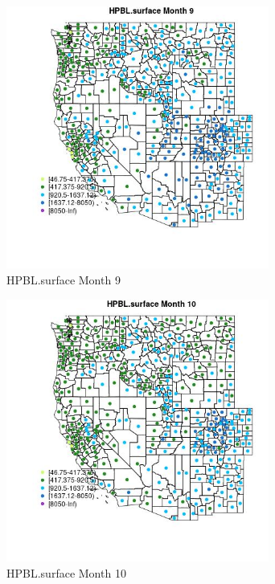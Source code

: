 \begin{figure} 
\centering  
\includegraphics[width=0.77\textwidth]{Code_Outputs/df_report_ML_predictors_CountyCentroid_Locations_Dates_2008-01-01to2018-12-31_MapObsMo9HPBLsurface.jpg} 
\caption{\label{fig:df_report_ML_predictors_CountyCentroid_Locations_Dates_2008-01-01to2018-12-31MapObsMo9HPBLsurface}HPBL.surface Month 9} 
\end{figure} 
 

\begin{figure} 
\centering  
\includegraphics[width=0.77\textwidth]{Code_Outputs/df_report_ML_predictors_CountyCentroid_Locations_Dates_2008-01-01to2018-12-31_MapObsMo10HPBLsurface.jpg} 
\caption{\label{fig:df_report_ML_predictors_CountyCentroid_Locations_Dates_2008-01-01to2018-12-31MapObsMo10HPBLsurface}HPBL.surface Month 10} 
\end{figure} 
 

